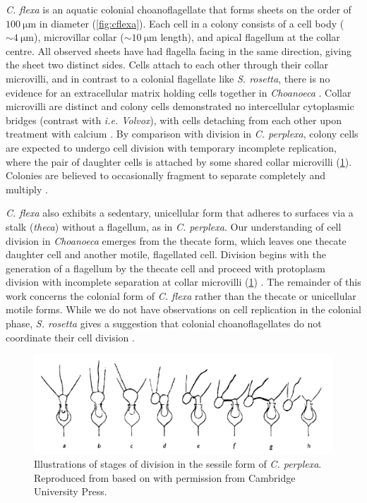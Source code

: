 \textit{C. flexa} is an aquatic colonial choanoflagellate that forms sheets on the order of $\SI{100}{\micro\meter}$ in diameter (\cref{fig:cflexa}).
Each cell in a colony consists of a cell body ($\sim \SI{4}{\micro\meter}$), microvillar collar ($\sim\SI{10}{\micro\meter}$ length), and apical flagellum at the collar centre.
All observed sheets have had flagella facing in the same direction, giving the sheet two distinct sides.
Cells attach to each other through their collar microvilli, and in contrast to a colonial flagellate like \textit{S. rosetta}, there is no evidence for an extracellular matrix holding cells together in \textit{Choanoeca} \citep{leadbeater1983,brunet2019}.
Collar microvilli are distinct and colony cells demonstrated no intercellular cytoplasmic bridges (contrast with \textit{i.e. Volvox}), with cells detaching from each other upon treatment with calcium \citep{thibaut}.
By comparison with division in \textit{C. perplexa}, colony cells are expected to undergo cell division with temporary incomplete replication, where the pair of daughter cells is attached by some shared collar microvilli (\cref{fig:division}).
Colonies are believed to occasionally fragment to separate completely and multiply \citep{leadbeater1983}.

\textit{C. flexa} also exhibits a sedentary, unicellular form that adheres to surfaces via a stalk (\textit{theca}) without a flagellum, as in \textit{C. perplexa}.
Our understanding of cell division in \textit{Choanoeca} emerges from the thecate form, which leaves one thecate daughter cell and another motile, flagellated cell.
Division begins with the generation of a flagellum by the thecate cell and proceed with protoplasm division with incomplete separation at collar microvilli (\cref{fig:division}) \citep{ellis1930,leadbeater1977}.
The remainder of this work concerns the colonial form of \textit{C. flexa} rather than the thecate or unicellular motile forms.
While we do not have observations on cell replication in the colonial phase, \textit{S. rosetta} gives a suggestion that colonial choanoflagellates do not coordinate their cell division \citep{fairclough2010}.

\begin{figure}[htbp]
	\centering
	\includegraphics[width=\textwidth]{division.png}
	\caption[Illustrations of stages of division in the sessile form of \textit{C. perplexa}]{Illustrations of stages of division in the sessile form of \textit{C. perplexa}. Reproduced from \citet{leadbeater1977} based on \citet{ellis1930} with permission from Cambridge University Press.}
	\label{fig:division}
\end{figure}

